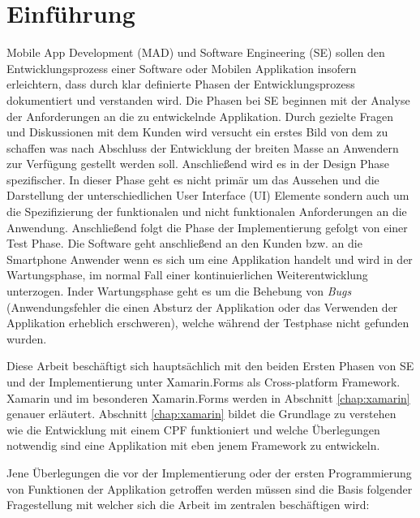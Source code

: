 %
%
% 
% 


\chapter{Einführung}
\label{chap:intro}
	Mobile App Development (MAD) und Software Engineering (SE) sollen den Entwicklungsprozess einer Software oder Mobilen Applikation insofern erleichtern, dass durch klar definierte Phasen der Entwicklungsprozess dokumentiert und verstanden wird.  Die Phasen bei SE beginnen mit der Analyse der Anforderungen an die zu entwickelnde Applikation. Durch gezielte Fragen und Diskussionen mit dem Kunden wird versucht ein erstes Bild von dem zu schaffen was nach Abschluss der Entwicklung der breiten Masse an Anwendern zur Verfügung gestellt werden soll. Anschließend wird es in der Design Phase spezifischer. In dieser Phase geht es nicht primär um das Aussehen und die Darstellung der unterschiedlichen User Interface (UI) Elemente sondern auch um die Spezifizierung der funktionalen und nicht funktionalen Anforderungen an die Anwendung. Anschließend folgt die Phase der Implementierung gefolgt von einer Test Phase. Die Software geht anschließend an den Kunden bzw. an die Smartphone Anwender wenn es sich um eine Applikation handelt und wird in der Wartungsphase, im normal Fall einer kontinuierlichen Weiterentwicklung unterzogen. Inder Wartungsphase geht es um die Behebung von \textit{Bugs} (Anwendungsfehler die einen Absturz der Applikation oder das Verwenden der Applikation erheblich erschweren), welche während der Testphase nicht gefunden wurden. 

	Diese Arbeit beschäftigt sich hauptsächlich mit den beiden Ersten Phasen von SE und der Implementierung unter Xamarin.Forms als Cross-platform Framework. Xamarin und im besonderen Xamarin.Forms werden in Abschnitt \ref{chap:xamarin} genauer erläutert. Abschnitt \ref{chap:xamarin} bildet die Grundlage zu verstehen wie die Entwicklung mit einem CPF funktioniert und welche Überlegungen notwendig sind eine Applikation mit eben jenem Framework zu entwickeln.

	Jene Überlegungen die vor der Implementierung oder der ersten Programmierung von Funktionen der Applikation getroffen werden müssen sind die Basis folgender Fragestellung mit welcher sich die Arbeit im zentralen beschäftigen wird:\vspace{1cm}

